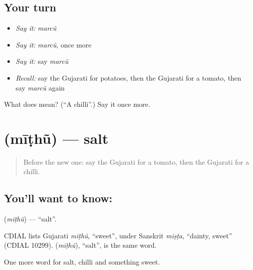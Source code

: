 \subsection*{Your turn}
\begin{itemize}
\raggedright
  \item \emph{Say it:} \emph{marcũ}
  \item \emph{Say it:} \emph{marcũ}, once more
  \item \emph{Say it:} say \emph{marcũ}
  \item \emph{Recall:} say the Gujarati for potatoes, then the Gujarati for a tomato, then say \emph{marcũ} again
\end{itemize}

\begin{tcolorbox}[breakable,colback=teal!4,colframe=teal!35!black,title={Before you move on}]
What does  mean? (\textquotedblleft{}A chilli\textquotedblright{}.) Say it once more.
\end{tcolorbox}
\section[\texorpdfstring{\gu{મીઠું} (mīṭhũ)}{મીઠું (mīṭhũ)}]{ (mīṭhũ) — salt}

\label{lesson:GU-C60-salt}



\begin{quote}
Before the new one: say the Gujarati for a tomato, then the Gujarati for a chilli.
\end{quote}

\subsection*{You'll want to know: }
\textbf{} (\emph{mīṭhũ}) — \textquotedblleft{}salt\textquotedblright{}.

\begin{cousinweb}
CDIAL lists Gujarati \emph{mīṭhũ}, \textquotedblleft{}sweet\textquotedblright{}, under Sanskrit \emph{miṣṭa}, \textquotedblleft{}dainty, sweet\textquotedblright{} (CDIAL 10299). \textbf{} (\emph{mīṭhũ}), \textquotedblleft{}salt\textquotedblright{}, is the same word.
\end{cousinweb}

\begin{grammarlens}[title={What you've built}]
One more word for salt, chilli and something sweet.
\end{grammarlens}

